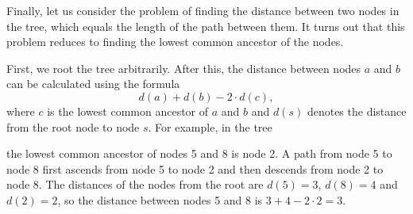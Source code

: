 Finally, let us consider the problem of
finding the distance between
two nodes in the tree, which equals
the length of the path between them.
It turns out that this problem reduces to
finding the lowest common ancestor of the nodes.

First, we root the tree arbitrarily.
After this, the distance between nodes $a$ and $b$
can be calculated using the formula
\[d(a)+d(b)-2 \cdot d(c),\]
where $c$ is the lowest common ancestor of $a$ and $b$
and $d(s)$ denotes the distance from the root node
to node $s$.
For example, in the tree

\begin{center}
\end{center}
the lowest common ancestor of nodes 5 and 8 is node 2.
A path from node 5 to node 8
first ascends from node 5 to node 2
and then descends from node 2 to node 8.
The distances of the nodes from the root are
$d(5)=3$, $d(8)=4$ and $d(2)=2$,
so the distance between nodes 5 and 8 is
$3+4-2\cdot2=3$.


